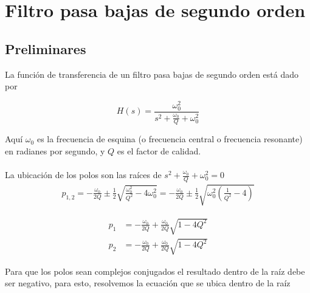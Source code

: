 \documentclass[12pt,a4paper]{article}
\begin{document}
	\section{Filtro pasa bajas de segundo orden}
	\subsection{Preliminares}
	La función de transferencia de un filtro pasa bajas de segundo orden está dado por
	\begin{tcolorbox}[colback=red!5!white,colframe=red!75!black,width=(\linewidth+0.45cm)]
		\begin{equation}
			H(s) = \frac{\omega_0^{2}}{s^2 + \frac{\omega_0}{Q} + \omega_0^{2} }
		\end{equation}
	\end{tcolorbox}
	Aquí $\omega_0$ es la frecuencia de esquina (o frecuencia central o frecuencia resonante) en radianes por segundo, y $Q$ es el factor de calidad.\\\\
	La ubicación de los polos son las raíces de $s^2 + \frac{\omega_0}{Q} + \omega_0^{2} = 0$
	\begin{align}
		p_{1,2} = -\frac{\omega_0}{2Q}\pm\frac{1}{2}\sqrt{\frac{\omega_0^{2}}{Q^2} - 4\omega_0^{2} } = -\frac{\omega_0}{2Q}\pm\frac{1}{2}\sqrt{ \omega_0^{2}\left( \frac{1}{Q^2} - 4 \right) }\nonumber
	\end{align}
	\begin{tcolorbox}[colback=red!5!white,colframe=red!75!black,width=(\linewidth+0.45cm)]
		\begin{subequations}
			\begin{align}
				p_1 &= - \frac{\omega_0}{2Q} + \frac{\omega_0}{2Q}\sqrt{1-4Q^2}\\
				p_2 &= - \frac{\omega_0}{2Q} + \frac{\omega_0}{2Q}\sqrt{1-4Q^2}
			\end{align}	
		\end{subequations}
	\end{tcolorbox}
	Para que los polos sean complejos conjugados el resultado dentro de la raíz debe ser negativo, para esto, resolvemos la ecuación que se ubica dentro de la raíz
	
\end{document}
